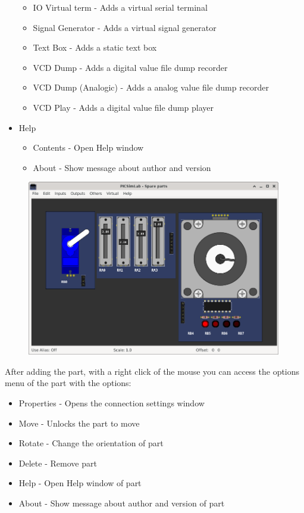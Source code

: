 \begin{itemize}
\begin{itemize}
  \item IO Virtual term - Adds a virtual serial terminal 
  \item Signal Generator - Adds a virtual signal generator
  \item Text Box - Adds a static text box
  \item VCD Dump - Adds a digital value file dump recorder 
  \item VCD Dump (Analogic) - Adds a analog value file dump recorder  
  \item VCD Play - Adds a digital value file dump player  
  \end{itemize}   
 \item Help
 \begin{itemize}
 \item Contents - Open Help window
 \item About - Show message about author and version
\end{itemize}
\end{itemize}


\begin{figure}[H]
\center
\includegraphics[width=0.99\textwidth]{img/spare.png} 
\end{figure} 

After adding the part, with a right click of the mouse you can access the options menu of the part with the options:
\begin{itemize}
 \item Properties - Opens the connection settings window
 \item Move - Unlocks the part to move
 \item Rotate - Change the orientation of part
 \item Delete - Remove part
 \item Help - Open Help window of part
 \item About - Show message about author and version of part
\end{itemize}


